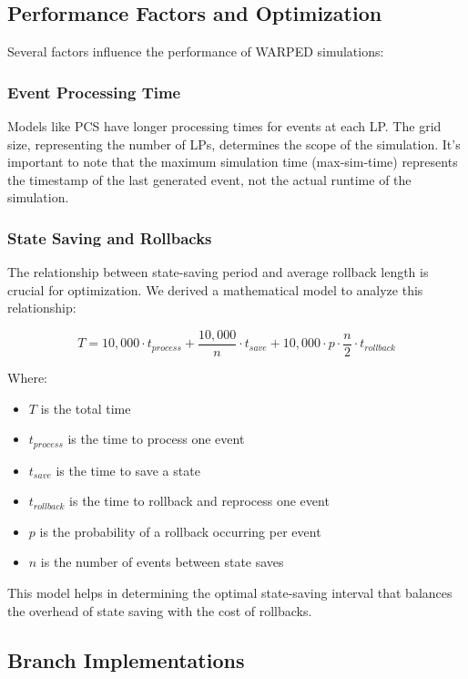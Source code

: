 \subsection{Performance Factors and Optimization}

Several factors influence the performance of WARPED simulations:

\subsubsection{Event Processing Time}

Models like PCS have longer processing times for events at each LP. The grid size, representing the number of LPs, determines the scope of the simulation. It's important to note that the maximum simulation time (max-sim-time) represents the timestamp of the last generated event, not the actual runtime of the simulation.

\subsubsection{State Saving and Rollbacks}

The relationship between state-saving period and average rollback length is crucial for optimization. We derived a mathematical model to analyze this relationship:

\begin{equation}
T = 10,000 \cdot t_{process} + \frac{10,000}{n} \cdot t_{save} + 10,000 \cdot p \cdot \frac{n}{2} \cdot t_{rollback}
\end{equation}

Where:
\begin{itemize}
    \item $T$ is the total time
    \item $t_{process}$ is the time to process one event
    \item $t_{save}$ is the time to save a state
    \item $t_{rollback}$ is the time to rollback and reprocess one event
    \item $p$ is the probability of a rollback occurring per event
    \item $n$ is the number of events between state saves
\end{itemize}

This model helps in determining the optimal state-saving interval that balances the overhead of state saving with the cost of rollbacks.

\subsection{Branch Implementations}

